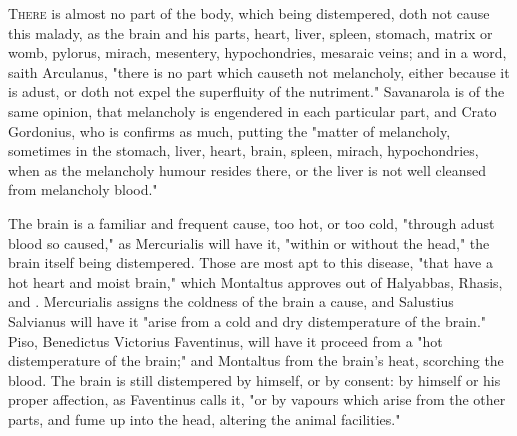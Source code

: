 \lettrine{T}{here} is almost no part of the body, which being distempered, doth
not cause this malady, as the brain and his parts, heart, liver, spleen,
stomach, matrix or womb, pylorus, mirach, mesentery, hypochondries, mesaraic
veins; and in a word, saith Arculanus, "there is no part
which causeth not melancholy, either because it is adust, or doth not expel the
superfluity of the nutriment." Savanarola  is of the same opinion, that melancholy is
engendered in each particular part, and Crato
 Gordonius, who is
 confirms as
much, putting the "matter of melancholy, sometimes in the
stomach, liver, heart, brain, spleen, mirach, hypochondries, when as the
melancholy humour resides there, or the liver is not well cleansed from
melancholy blood."

The brain is a familiar and frequent cause, too hot, or too cold,
"through adust blood so caused," as Mercurialis will have
it, "within or without the head," the brain itself being distempered. Those are
most apt to this disease, "that have a hot heart and moist
brain," which Montaltus  approves
out of Halyabbas, Rhasis, and \Avicenna{}. Mercurialis
 assigns the coldness of the brain a cause,
and Salustius Salvianus 
will have it "arise from a cold and dry distemperature of
the brain." Piso, Benedictus Victorius Faventinus, will have it proceed from a
"hot distemperature of the brain;" and
Montaltus  from the brain's
heat, scorching the blood. The brain is still distempered by himself, or by
consent: by himself or his proper affection, as Faventinus calls it,
"or by vapours which arise from the other parts, and fume
up into the head, altering the animal facilities."

